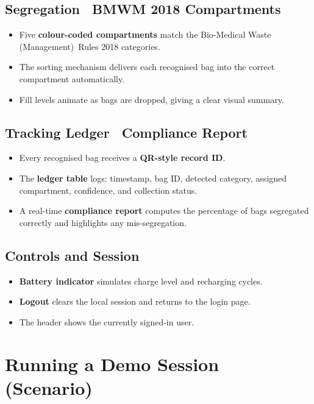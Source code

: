 \documentclass[11pt, a4paper]{article}
\begin{document}
\subsection{Segregation \textperiodcentered\ BMWM 2018 Compartments}
\begin{itemize}[leftmargin=1.6em, itemsep=2pt]
  \item Five \textbf{colour-coded compartments} match the Bio-Medical Waste
        (Management)\ Rules 2018 categories.
  \item The sorting mechanism delivers each recognised bag into the correct
        compartment automatically.
  \item Fill levels animate as bags are dropped, giving a clear visual summary.
\end{itemize}

\subsection{Tracking Ledger \textperiodcentered\ Compliance Report}
\begin{itemize}[leftmargin=1.6em, itemsep=2pt]
  \item Every recognised bag receives a \textbf{QR-style record ID}.
  \item The \textbf{ledger table} logs: timestamp, bag ID, detected category,
        assigned compartment, confidence, and collection status.
  \item A real-time \textbf{compliance report} computes the percentage of bags
        segregated correctly and highlights any mis-segregation.
\end{itemize}

\subsection{Controls and Session}
\begin{itemize}[leftmargin=1.6em, itemsep=2pt]
  \item \textbf{Battery indicator} simulates charge level and recharging cycles.
  \item \textbf{Logout} clears the local session and returns to the login page.
  \item The header shows the currently signed-in user.
\end{itemize}

\section{Running a Demo Session (Scenario)}
\end{document}
